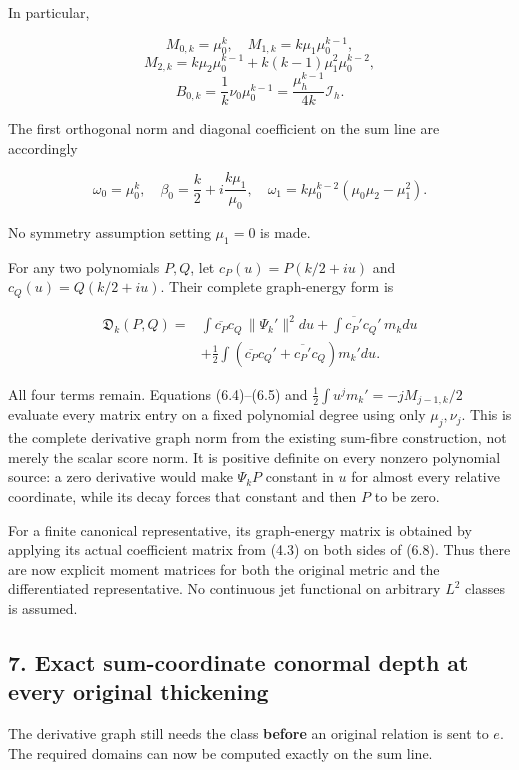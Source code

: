 \documentclass[
]{article}
\begin{document}
In particular,

\[M_{0,k}=\mu_0^k,\quad M_{1,k}=k\mu_1\mu_0^{k-1},\]
\[M_{2,k}=k\mu_2\mu_0^{k-1}+k(k-1)\mu_1^2\mu_0^{k-2},\]
\[B_{0,k}=\frac1k\nu_0\mu_0^{k-1}=\frac{\mu_h^{k-1}}{4k}\mathcal I_h.\tag{6.6}\]

The first orthogonal norm and diagonal coefficient on the sum line are
accordingly

\[\omega_0=\mu_0^k,\quad
\beta_0=\frac k2+i\frac{k\mu_1}{\mu_0},\quad
\omega_1=k\mu_0^{k-2}(\mu_0\mu_2-\mu_1^2).\tag{6.7}\]

No symmetry assumption setting \(\mu_1=0\) is made.

For any two polynomials \(P,Q\), let \(c_P(u)=P(k/2+iu)\) and
\(c_Q(u)=Q(k/2+iu)\). Their complete graph-energy form is

\[\begin{aligned}
\mathfrak D_k(P,Q)={}&\int\overline{c_P}c_Q\,\|\Psi_k'\|^2du
+\int\overline{c_P'}c_Q'\,m_kdu\\
&+\frac12\int\left(\overline{c_P}c_Q'+\overline{c_P'}c_Q\right)m_k'du.
\end{aligned}\tag{6.8}\]

All four terms remain. Equations (6.4)--(6.5) and
\(\frac12\int u^jm_k'=-jM_{j-1,k}/2\) evaluate every matrix entry on a
fixed polynomial degree using only \(\mu_j,\nu_j\). This is the complete
derivative graph norm from the existing sum-fibre construction, not
merely the scalar score norm. It is positive definite on every nonzero
polynomial source: a zero derivative would make \(\Psi_kP\) constant in
\(u\) for almost every relative coordinate, while its decay forces that
constant and then \(P\) to be zero.

For a finite canonical representative, its graph-energy matrix is
obtained by applying its actual coefficient matrix from (4.3) on both
sides of (6.8). Thus there are now explicit moment matrices for both the
original metric and the differentiated representative. No continuous jet
functional on arbitrary \(L^2\) classes is assumed.

\subsection{7. Exact sum-coordinate conormal depth at every original
thickening}\label{exact-sum-coordinate-conormal-depth-at-every-original-thickening}

The derivative graph still needs the class \textbf{before} an original
relation is sent to \(e\). The required domains can now be computed
exactly on the sum line.
\end{document}
